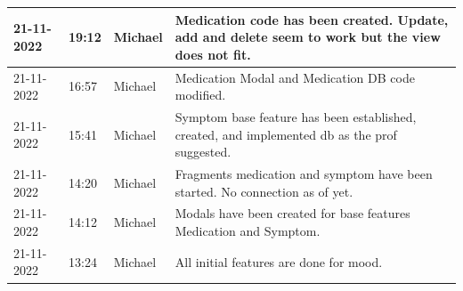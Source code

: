 \documentclass[11pt]{article}
\begin{document}
\begin{center}
\begin{longtable}{|p{2cm}|l|p{2cm}|p{10.5cm}|}
            21-11-2022                                 & 19:12                              & Michael                                 & Medication code has been created. Update, add and delete seem to work but the view does not fit.                                                                                                                                                                                                             \\ \hline
            21-11-2022                                 & 16:57                              & Michael                                 & Medication Modal and Medication DB code modified.                                                                                                                                                                                                                                                            \\ \hline
            21-11-2022                                 & 15:41                              & Michael                                 & Symptom base feature has been established, created, and implemented db as the prof suggested.                                                                                                                                                                                                                \\ \hline
            21-11-2022                                 & 14:20                              & Michael                                 & Fragments medication and symptom have been started. No connection as of yet.                                                                                                                                                                                                                                 \\ \hline
            21-11-2022                                 & 14:12                              & Michael                                 & Modals have been created for base features Medication and Symptom.                                                                                                                                                                                                                                           \\ \hline
            21-11-2022                                 & 13:24                              & Michael                                 & All initial features are done for mood.                                                                                                                                                                                                                                                                      \\ \hline

\end{longtable}
\end{center}
\end{document}
